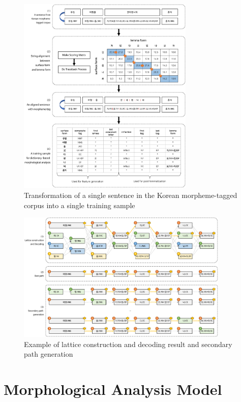 \documentclass[AMS,STIX2COL]{WileyNJD-v2}
\begin{document}
    \begin{figure}[t]
        \centerline{\includegraphics[width=0.75\textwidth]{fig1.1}}
        \caption{Transformation of a single sentence in the Korean morpheme-tagged corpus into a single training sample}
        \label{fig:sample}
    \end{figure}


    \begin{figure}[t]
        \centerline{\includegraphics[width=0.9\textwidth]{fig2.1}}
        \caption{Example of lattice construction and decoding result and secondary path generation}
        \label{fig:lattice}
    \end{figure}


    \section{Morphological Analysis Model}\label{sec:morphological-analysis-model}
\end{document}
